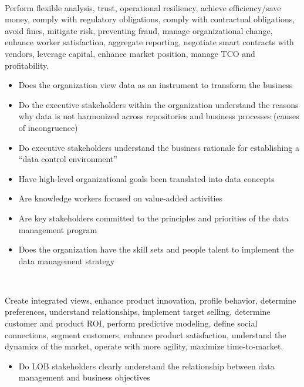 ~\\

\begin{description}[nosep,font=\bfseries]

  \item [High-level Organizational Goals]
  Perform flexible analysis, trust, operational resiliency, achieve efficiency/\-save money, 
  comply with regulatory obligations, comply with contractual obligations, avoid fines, 
  mitigate risk, preventing fraud, manage organizational change, enhance worker satisfaction,
  aggregate reporting, negotiate smart contracts with vendors, leverage capital, 
  enhance market position, manage TCO and profitability. \\

  \begin{itemize}
    \item Does the organization view data as an instrument to transform the business
    \item Do the executive stakeholders within the organization understand the reasons why data is not harmonized across repositories and business processes (causes of incongruence)
    \item Do executive stakeholders understand the business rationale for establishing a “data control environment”
    \item Have high-level organizational goals been translated into data concepts
    \item Are knowledge workers focused on value-added activities
    \item Are key stakeholders committed to the principles and priorities of the data management program
    \item Does the organization have the skill sets and people talent to implement the data management strategy
  \end{itemize}
  ~\\
  \item [High-Level Business Goals]
  Create integrated views, enhance product innovation, profile behavior, 
  determine preferences, understand relationships, implement target selling, 
  determine customer and product ROI, perform predictive modeling, 
  define social connections, segment customers, enhance product satisfaction, 
  understand the dynamics of the market, operate with more agility, 
  maximize time-to-market.
  ~\\
  \begin{itemize}
    \item Do LOB stakeholders clearly understand the relationship between data management and business objectives

\end{itemize}
\end{description}
